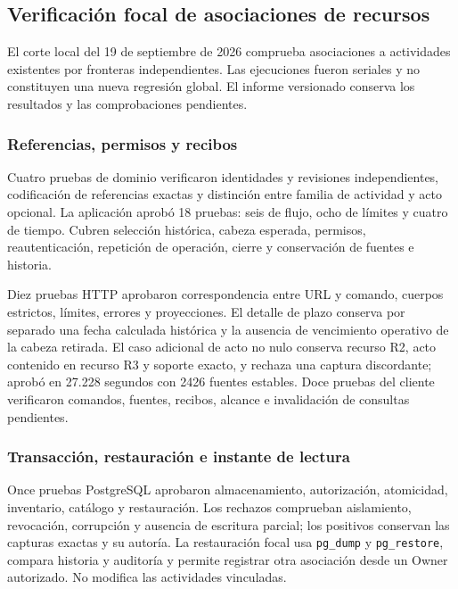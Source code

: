 \subsection{Verificación focal de asociaciones de recursos}\label{sec:pruebas-asociaciones-recursos}

El corte local del 19 de septiembre de 2026 comprueba asociaciones a actividades existentes por fronteras independientes. Las ejecuciones fueron seriales y no constituyen una nueva regresión global. El informe versionado  conserva los resultados y las comprobaciones pendientes.

\subsubsection{Referencias, permisos y recibos}

Cuatro pruebas de dominio verificaron identidades y revisiones independientes, codificación de referencias exactas y distinción entre familia de actividad y acto opcional. La aplicación aprobó 18 pruebas: seis de flujo, ocho de límites y cuatro de tiempo. Cubren selección histórica, cabeza esperada, permisos, reautenticación, repetición de operación, cierre y conservación de fuentes e historia.

Diez pruebas HTTP aprobaron correspondencia entre URL y comando, cuerpos estrictos, límites, errores y proyecciones. El detalle de plazo conserva por separado una fecha calculada histórica y la ausencia de vencimiento operativo de la cabeza retirada. El caso adicional de acto no nulo conserva recurso R2, acto contenido en recurso R3 y soporte exacto, y rechaza una captura discordante; aprobó en 27.228 segundos con 2426 fuentes estables. Doce pruebas del cliente verificaron comandos, fuentes, recibos, alcance e invalidación de consultas pendientes.

\subsubsection{Transacción, restauración e instante de lectura}

Once pruebas PostgreSQL aprobaron almacenamiento, autorización, atomicidad, inventario, catálogo y restauración. Los rechazos comprueban aislamiento, revocación, corrupción y ausencia de escritura parcial; los positivos conservan las capturas exactas y su autoría. La restauración focal usa \texttt{pg\_dump} y \texttt{pg\_restore}, compara historia y auditoría y permite registrar otra asociación desde un Owner autorizado. No modifica las actividades vinculadas.

